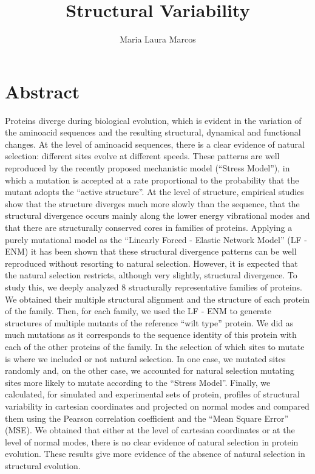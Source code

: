 \documentclass{article}
\title{Structural Variability}
\author{Maria Laura Marcos}
\begin{document}
\maketitle

\section{Abstract}
Proteins diverge during biological evolution, which is evident in the variation of the aminoacid sequences and the resulting structural, dynamical and functional changes. At the level of aminoacid sequences, there is a clear evidence of natural selection: different sites evolve at different speeds. These patterns are well reproduced by the recently proposed mechanistic model (``Stress Model''), in which a mutation is accepted at a rate proportional to the probability that the mutant adopts the ``active structure''. At the level of structure, empirical studies show that the structure diverges much more slowly than the sequence, that the structural divergence occurs mainly along the lower energy vibrational modes and that there are structurally conserved cores in families of proteins. Applying a purely mutational model as the ``Linearly Forced - Elastic Network Model'' (LF - ENM) it has been shown that these structural divergence patterns can be well reproduced without resorting to natural selection. However, it is expected that the natural selection restricts, although very slightly, structural divergence. To study this, we deeply analyzed 8 structurally representative families of proteins. We obtained their multiple structural alignment and the structure of each protein of the family. Then, for each family, we used the LF - ENM to generate structures of multiple mutants of the reference ``wilt type'' protein. We did as much mutations as it corresponds to the sequence identity of this protein with each of the other proteins of the family. In the selection of which sites to mutate is where we included or not natural selection. In one case, we mutated sites randomly and, on the other case, we accounted for natural selection mutating sites more likely to mutate according to the ``Stress Model''. Finally, we calculated, for simulated and experimental sets of protein, profiles of structural variability in cartesian coordinates and projected on normal modes and compared them using the Pearson correlation coefficient and the ``Mean Square Error'' (MSE). We obtained that either at the level of cartesian coordinates or at the level of normal modes, there is no clear evidence of natural selection in protein evolution. These results give more evidence of the absence of natural selection in structural evolution.
\end{document}
